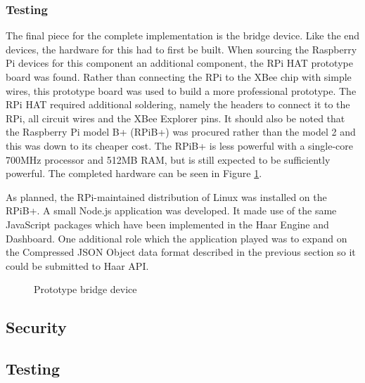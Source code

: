       \subsubsection{Testing}
      The final piece for the complete implementation is the bridge device. Like the end devices, the hardware for this had to first be built. When sourcing the Raspberry Pi devices for this component an additional component, the RPi HAT prototype board was found. Rather than connecting the RPi to the XBee chip with simple wires, this prototype board was used to build a more professional prototype. The RPi HAT required additional soldering, namely the headers to connect it to the RPi, all circuit wires and the XBee Explorer pins. It should also be noted that the Raspberry Pi model B+ (RPiB+)  was procured rather than the model 2 and this was down to its cheaper cost. The RPiB+ is less powerful with a single-core 700MHz processor and 512MB RAM, but is still expected to be sufficiently powerful. The completed hardware can be seen in Figure \ref{figure:bridge-device}.

      As planned, the RPi-maintained distribution of Linux was installed on the RPiB+. A small Node.js application was developed. It made use of the same JavaScript packages which have been implemented in the Haar Engine and Dashboard. One additional role which the application played was to expand on the Compressed JSON Object data format described in the previous section so it could be submitted to Haar API.

      \begin{figure}
        \centering
        \caption{Prototype bridge device}\label{figure:bridge-device}
      \end{figure}

    \subsection{Security}
    \subsection{Testing}
